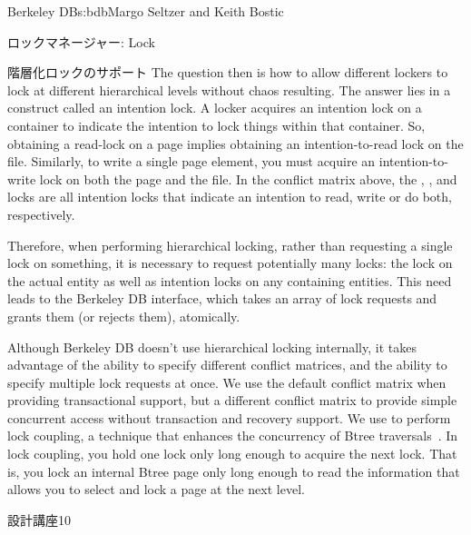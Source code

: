 \begin{aosachapter}{Berkeley DB}{s:bdb}{Margo Seltzer and Keith Bostic}
\begin{aosasect1}{ロックマネージャー: Lock}
\begin{aosasect2}{階層化ロックのサポート}
The question then is how to allow different lockers to lock at
different hierarchical levels without chaos resulting.  The answer
lies in a construct called an intention lock. A locker acquires an
intention lock on a container to indicate the intention to lock things
within that container. So, obtaining a read-lock on a page implies
obtaining an intention-to-read lock on the file. Similarly, to write a
single page element, you must acquire an intention-to-write lock on
both the page and the file. In the conflict matrix above, the ,
, and  locks are all intention locks that indicate an
intention to read, write or do both, respectively.

Therefore, when performing hierarchical locking, rather than
requesting a single lock on something, it is necessary to request
potentially many locks: the lock on the actual entity as well as
intention locks on any containing entities. This need leads to the
Berkeley DB  interface, which
takes an array of lock requests and grants them (or rejects them),
atomically.

Although Berkeley DB doesn't use hierarchical locking internally, it
takes advantage of the ability to specify different conflict
matrices, and the ability to specify multiple lock requests at once.
We use the default conflict matrix when providing transactional
support, but a different conflict matrix to provide simple concurrent
access without transaction and recovery support.  We use 
 to perform lock
coupling, a technique that enhances the concurrency of Btree
traversals~\cite{bib:comer:btree}.  In lock coupling, you hold
one lock only long enough to acquire the next lock.  That is, you lock
an internal Btree page only long enough to read the information that
allows you to select and lock a page at the next level.

\begin{aosabox}{設計講座10}


\end{aosabox}
\end{aosasect2}
\end{aosasect1}
\end{aosachapter}
